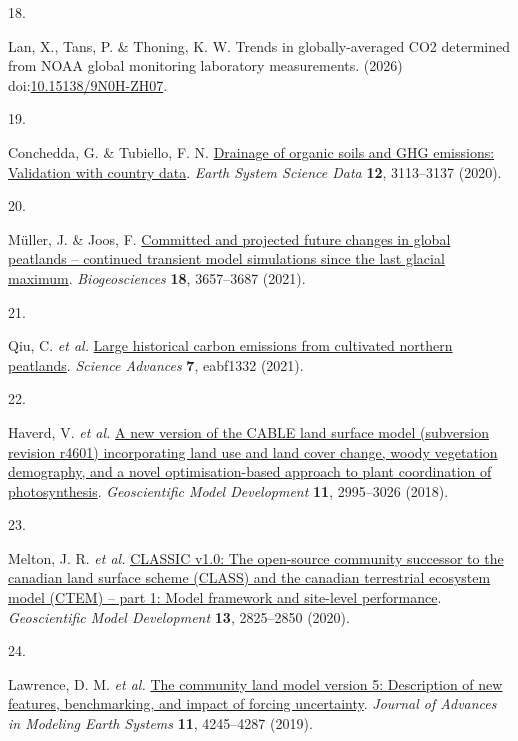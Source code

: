 \documentclass[
  12pt,
  letterpaper,
  DIV=11,
  numbers=noendperiod]{scrartcl}
\newlength{\cslhangindent}
\newlength{\csllabelwidth}
\newenvironment{CSLReferences}[2] %
 {\begin{list}{}{%
  \setlength{\itemindent}{0pt}
  \setlength{\leftmargin}{0pt}
  \setlength{\parsep}{0pt}
  \ifodd #1
   \setlength{\leftmargin}{\cslhangindent}
   \setlength{\itemindent}{-1\cslhangindent}
  \fi
  \setlength{\itemsep}{#2\baselineskip}}}
 {\end{list}}
\newcommand{\CSLLeftMargin}[1]{\parbox[t]{\csllabelwidth}{\strut#1\strut}}
\newcommand{\CSLRightInline}[1]{\parbox[t]{\linewidth - \csllabelwidth}{\strut#1\strut}}
\begin{document}
\begin{CSLReferences}{0}{0}
\CSLLeftMargin{18. }%
\CSLRightInline{Lan, X., Tans, P. \& Thoning, K. W. Trends in
globally-averaged CO2 determined from NOAA global monitoring laboratory
measurements. (2026)
doi:\href{https://doi.org/10.15138/9N0H-ZH07}{10.15138/9N0H-ZH07}.}

\CSLLeftMargin{19. }%
\CSLRightInline{Conchedda, G. \& Tubiello, F. N.
\href{https://doi.org/10.5194/essd-12-3113-2020}{Drainage of organic
soils and GHG emissions: Validation with country data}. \emph{Earth
System Science Data} \textbf{12}, 3113--3137 (2020).}

\CSLLeftMargin{20. }%
\CSLRightInline{Müller, J. \& Joos, F.
\href{https://doi.org/10.5194/bg-18-3657-2021}{Committed and projected
future changes in global peatlands -- continued transient model
simulations since the last glacial maximum}. \emph{Biogeosciences}
\textbf{18}, 3657--3687 (2021).}

\CSLLeftMargin{21. }%
\CSLRightInline{Qiu, C. \emph{et al.}
\href{https://doi.org/10.1126/sciadv.abf1332}{Large historical carbon
emissions from cultivated northern peatlands}. \emph{Science Advances}
\textbf{7}, eabf1332 (2021).}

\CSLLeftMargin{22. }%
\CSLRightInline{Haverd, V. \emph{et al.}
\href{https://doi.org/10.5194/gmd-11-2995-2018}{A new version of the
CABLE land surface model (subversion revision r4601) incorporating land
use and land cover change, woody vegetation demography, and a novel
optimisation-based approach to plant coordination of photosynthesis}.
\emph{Geoscientific Model Development} \textbf{11}, 2995--3026 (2018).}

\CSLLeftMargin{23. }%
\CSLRightInline{Melton, J. R. \emph{et al.}
\href{https://doi.org/10.5194/gmd-13-2825-2020}{CLASSIC v1.0: The
open-source community successor to the canadian land surface scheme
(CLASS) and the canadian terrestrial ecosystem model (CTEM) -- part 1:
Model framework and site-level performance}. \emph{Geoscientific Model
Development} \textbf{13}, 2825--2850 (2020).}

\CSLLeftMargin{24. }%
\CSLRightInline{{Lawrence, D. M. \emph{et al.}}
\href{https://doi.org/10.1029/2018MS001583}{The community land model
version 5: Description of new features, benchmarking, and impact of
forcing uncertainty}. \emph{Journal of Advances in Modeling Earth
Systems} \textbf{11}, 4245--4287 (2019).}


\end{CSLReferences}
\end{document}
